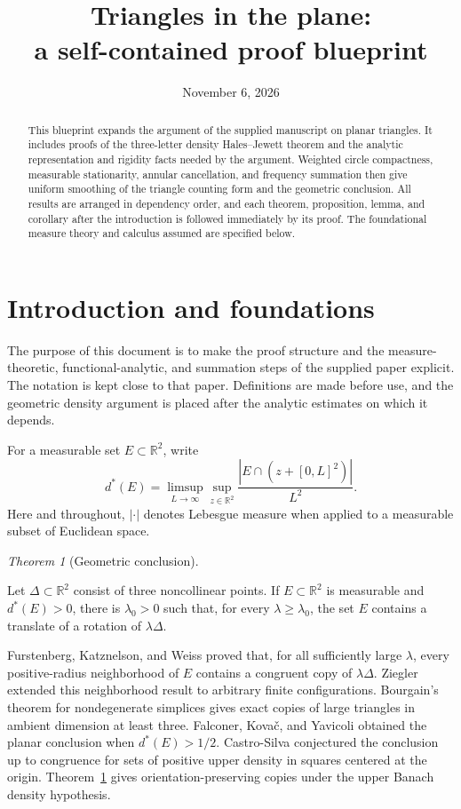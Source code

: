 \documentclass[11pt]{amsart}
\title[Blueprint: triangles in the plane]{Triangles in the plane:\\a self-contained proof blueprint}
\author{}
\date{November 6, 2026}
\newcommand{\R}{\mathbb R}
\theoremstyle{definition}
\theoremstyle{remark}
\newtheorem{maintheorem}{Theorem}
\numberwithin{equation}{section}
\providecommand{\lean}[1]{}
\providecommand{\leanok}{}
\begin{document}
\begin{abstract}
This blueprint expands the argument of the supplied manuscript on planar
triangles.  It includes proofs of the three-letter density Hales--Jewett
theorem and the analytic representation and rigidity facts needed by the
argument.  Weighted circle compactness, measurable stationarity, annular
cancellation, and frequency summation then give uniform smoothing of the
triangle counting form and the geometric conclusion.  All results are
arranged in dependency order, and each theorem, proposition, lemma, and
corollary after the introduction is followed immediately by its proof.
The foundational measure theory and calculus assumed are specified below.
\end{abstract}
\maketitle
\tableofcontents

\section{Introduction and foundations}\label{sec:introduction}

The purpose of this document is to make the proof structure and the
measure-theoretic, functional-analytic, and summation steps of the supplied
paper explicit.  The notation is kept close to that paper.  Definitions
are made before use, and the geometric density argument is placed after
the analytic estimates on which it depends.

For a measurable set $E\subset\R^2$, write
\[
 d^*(E)=\limsup_{L\to\infty}\sup_{z\in\R^2}
       \frac{|E\cap(z+[0,L]^2)|}{L^2}.
\]
Here and throughout, $|\cdot|$ denotes Lebesgue measure when applied
to a measurable subset of Euclidean space.

\begin{maintheorem}[Geometric conclusion]\label{triangles_in_the_plane}
\lean{Auto.triangles_in_the_plane}
\leanok
Let $\Delta\subset\R^2$ consist of three noncollinear points.  If
$E\subset\R^2$ is measurable and $d^*(E)>0$, there is $\lambda_0>0$
such that, for every $\lambda\ge\lambda_0$, the set $E$ contains a
translate of a rotation of $\lambda\Delta$.
\end{maintheorem}

Furstenberg, Katznelson, and Weiss \cite[Theorem~B]{FKW} proved that,
for all sufficiently large $\lambda$, every positive-radius neighborhood
of $E$ contains a congruent copy of $\lambda\Delta$. Ziegler \cite{Ziegler}
extended this neighborhood result to arbitrary finite configurations.
Bourgain's theorem for nondegenerate simplices \cite{Bourgain} gives
exact copies of large triangles in ambient dimension at least three.
Falconer, Kova\v{c}, and Yavicoli \cite[Theorem~1.4]{FKY} obtained
the planar conclusion when $d^*(E)>1/2$. Castro-Silva
\cite[Conjecture~1]{CS} conjectured the conclusion up to congruence
for sets of positive upper density in squares centered at the origin.
Theorem~\ref{triangles_in_the_plane} gives orientation-preserving copies under
the upper Banach density hypothesis.
\end{document}
